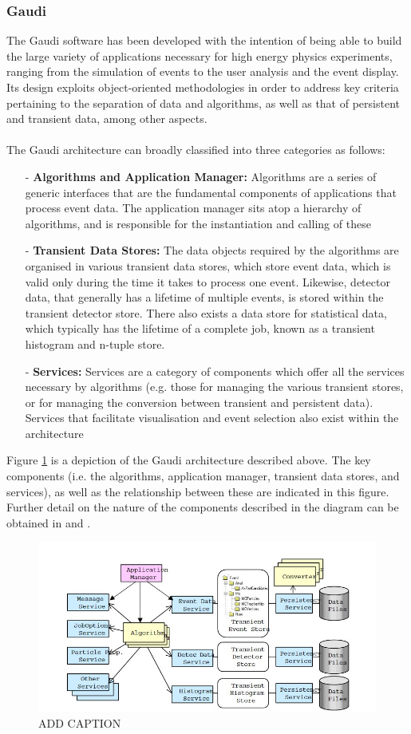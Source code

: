 \subsubsection{Gaudi}
The Gaudi software has been developed with the intention of being able to build the large variety of applications necessary for high energy physics experiments, ranging from the simulation of events to the user analysis and the event display. Its design exploits object-oriented methodologies in order to address key criteria pertaining to the separation of data and algorithms, as well as that of persistent and transient data, among other aspects. \\
\\
The Gaudi architecture can broadly classified into three categories as follows:
\begin{itemize}
\item[-] \textbf{Algorithms and Application Manager:} Algorithms are a series of generic interfaces that are the fundamental components of applications that process event data. The application manager sits atop a hierarchy of algorithms, and is responsible for the instantiation and calling of these 
\item[-]\textbf{Transient Data Stores:} The data objects required by the algorithms are organised in various transient data stores, which store event data, which is valid only during the time it takes to process one event. Likewise, detector data, that generally has a lifetime of multiple events, is stored within the transient detector store. There also exists a data store for statistical data, which typically has the lifetime of a complete job, known as a transient histogram and n-tuple store. 
\item[-] \textbf{Services:} Services are a category of components which offer all the services necessary by algorithms (e.g. those for managing the various transient stores, or for managing the conversion between transient and persistent data). Services that facilitate visualisation and event selection also exist within the architecture
\end{itemize}
Figure \ref{GaudiArchitecture} is a depiction of the Gaudi architecture described above. The key components (i.e. the algorithms, application manager, transient data stores, and services), as well as the relationship between these are indicated in this figure. Further detail on the nature of the components described in the diagram can be obtained in \cite{BARRAND200145} and \cite{Clemencic:2010zz}.
\begin{figure}[H]
    \centering 
    \includegraphics[scale=0.8]{GaudiArchitecture.jpg}
    \caption{ADD CAPTION}
    \label{GaudiArchitecture}
\end{figure}



